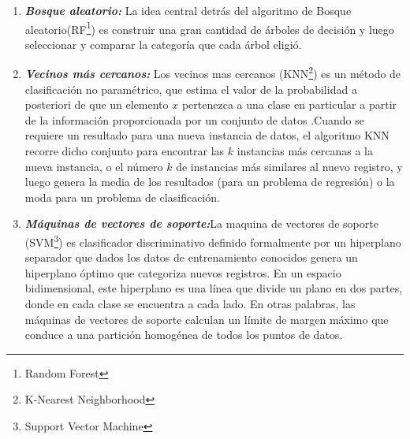 \begin{enumerate}[label=\textbf{\arabic*})]
\begin{enumerate}[label=\textbf{(\alph*)}]
		\item \textit{\textbf{Bosque aleatorio:}}
		La idea central detrás del algoritmo de Bosque aleatorio(RF\footnote{Random Forest}) es construir una gran cantidad de árboles de decisión y luego seleccionar y comparar la categoría que cada árbol eligió\cite{Roman2019}. 
		
		\item \textit{\textbf{Vecinos más cercanos:}}
		Los vecinos mas cercanos (KNN\footnote{K-Nearest Neighborhood}) es un método de clasificación no paramétrico, que estima el valor de la probabilidad a posteriori de que un elemento $x$ pertenezca a una clase en particular a partir de la información proporcionada por un conjunto de datos .Cuando se requiere un resultado para una nueva instancia de datos, el algoritmo KNN recorre dicho conjunto para encontrar las $k$ instancias más cercanas a la nueva instancia, o el número $k$ de instancias más similares al nuevo registro, y luego genera la media de los resultados (para un problema de regresión) o la moda para un problema de clasificación\cite{Shaw2019}.
		
		\item \textit{\textbf{Máquinas de vectores de soporte:}}La maquina de vectores de soporte (SVM\footnote{Support Vector Machine}) es clasificador discriminativo definido formalmente por un hiperplano separador que dados los datos de entrenamiento conocidos genera un hiperplano óptimo que categoriza nuevos registros. En un espacio bidimensional, este hiperplano es una línea que divide un plano en dos partes, donde en cada clase se encuentra a cada lado. En otras palabras, las máquinas de vectores de soporte calculan un límite de margen máximo que conduce a una partición homogénea de todos los puntos de datos\cite{Patel2017}. 
	\end{enumerate}
	
\end{enumerate}

\clearpage
